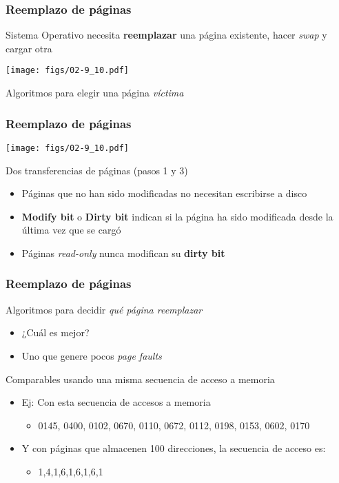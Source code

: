 \documentclass[letter]{beamer}
\begin{document}
\begin{frame}
  \frametitle{Reemplazo de páginas}

  Sistema Operativo necesita {\bf reemplazar} una página existente,
  hacer {\em swap} y cargar otra

  \begin{center}
    \texttt{[image: figs/02-9\_10.pdf]}
  \end{center}

  Algoritmos para elegir una página {\em víctima}  
  

\end{frame}
\begin{frame}
  \frametitle{Reemplazo de páginas}

  \begin{center}
    \texttt{[image: figs/02-9\_10.pdf]}
  \end{center}

  Dos transferencias de páginas (pasos 1 y 3)
  \begin{itemize}
    \item Páginas que no han sido modificadas no necesitan escribirse
          a disco
    \item {\bf Modify bit} o {\bf Dirty bit} indican si la página ha sido modificada
          desde la última vez que se cargó
    \item Páginas {\em read-only} nunca modifican su {\bf dirty bit}
  \end{itemize}

\end{frame}

\begin{frame}
  \frametitle{Reemplazo de páginas}

  Algoritmos para decidir {\em qué página reemplazar}
  \begin{itemize}
    \item ¿Cuál es mejor?
    \item Uno que genere pocos {\em page faults}
  \end{itemize}
  
  Comparables usando una misma secuencia de acceso a memoria
  \begin{itemize}
    \item Ej: Con esta secuencia de accesos a memoria
      \begin{itemize}
        \item 0145, 0400, 0102, 0670, 0110, 0672, 0112, 0198, 0153, 0602, 0170
      \end{itemize}
    \item Y con páginas que almacenen 100 direcciones, la secuencia de acceso es:
      \begin{itemize}
        \item 1,4,1,6,1,6,1,6,1
      \end{itemize}
  \end{itemize}

\end{frame}
\end{document}
